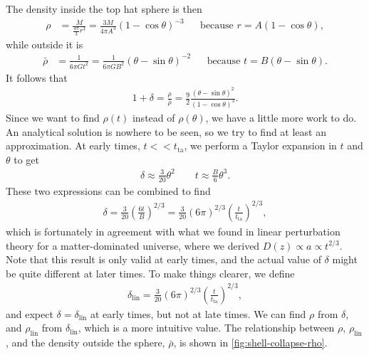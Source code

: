The density inside the top hat sphere is then
\begin{align*}
	\rho
	&= \frac{M}{\frac{4\pi}{3}r^3}
	= \frac{3M}{4\pi A^3} (1-\cos\theta)^{-3}
	&&\text{because } r = A(1-\cos\theta),
\end{align*}
while outside it is
\begin{align*}
	\bar{\rho}
	&= \frac{1}{6\pi G t^2}
	= \frac{1}{6 \pi G B^2} (\theta-\sin\theta)^{-2}
	&& \text{because } t = B(\theta - \sin\theta).
\end{align*}
It follows that
\begin{align*}
	1 + \delta
	= \frac{\rho}{\bar{\rho}}
	= \frac{9}{2} \frac{(\theta-\sin\theta)^{2}}{(1-\cos\theta)^3}.
\end{align*}
Since we want to find $\rho(t)$ instead of $\rho(\theta)$, we have a little more work to do.
An analytical solution is nowhere to be seen, so we try to find at least an approximation.
At early times, $t << t_\text{ta}$, we perform a Taylor expansion in $t$ and $\theta$ to get
\begin{align*}
	\delta \approx \frac{3}{20} \theta^2
	\qquad
	t \approx \frac{B}{6} \theta^3.
\end{align*}
These two expressions can be combined to find
\begin{align*}
	\delta
	= \frac{3}{20} \left( \frac{6 t}{B} \right)^{2/3}
	= \frac{3}{20} (6\pi)^{2/3} \left( \frac{t}{t_\text{ta}} \right)^{2/3},
\end{align*}
which is fortunately in agreement with what we found in linear perturbation theory for a matter-dominated universe, where we derived $D(z) \propto a \propto t^{2/3}$.
Note that this result is only valid at early times, and the actual value of $\delta$ might be quite different at later times. To make things clearer, we define
\begin{align*}
	\delta_\text{lin} = \frac{3}{20} (6\pi)^{2/3} \left( \frac{t}{t_\text{ta}} \right)^{2/3},
\end{align*}
and expect $\delta = \delta_\text{lin}$ at early times, but not at late times. We can find $\rho$ from $\delta$, and $\rho_\text{lin}$ from $\delta_\text{lin}$, which is a more intuitive value. The relationship between $\rho$, $\rho_\text{lin}$, and the density outside the sphere, $\bar{\rho}$, is shown in \cref{fig:shell-collapse-rho}.

